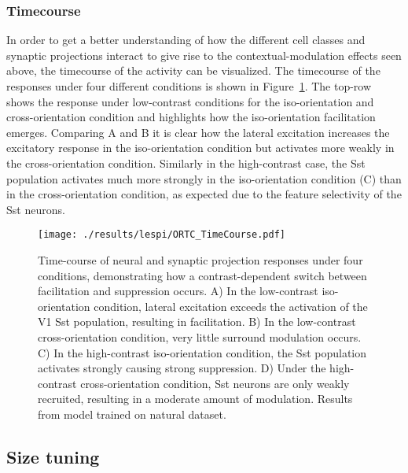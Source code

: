 \subsubsection{Timecourse}

In order to get a better understanding of how the different cell
classes and synaptic projections interact to give rise to the
contextual-modulation effects seen above, the timecourse of the
activity can be visualized. The timecourse of the responses under four
different conditions is shown in Figure~\ref{ORTC_TimeCourse}. The
top-row shows the response under low-contrast conditions for the
iso-orientation and cross-orientation condition and highlights how the
iso-orientation facilitation emerges. Comparing A and B it is clear 
how the lateral excitation increases the excitatory response in
the iso-orientation condition but activates more weakly in the
cross-orientation condition. Similarly in the high-contrast case, the
Sst population activates much more strongly in the iso-orientation
condition (C) than in the cross-orientation condition, as expected due
to the feature selectivity of the Sst neurons.

\begin{figure}
	\centering
        \texttt{[image: ./results/lespi/ORTC\_TimeCourse.pdf]}
	\caption[Time-course of neural and synaptic projection responses
      under four conditions, demonstrating how a contrast-dependent
      switch between facilitation and suppression occurs]{Time-course
      of neural and synaptic projection responses under four
      conditions, demonstrating how a contrast-dependent switch
      between facilitation and suppression occurs. A) In the
      low-contrast iso-orientation condition, lateral excitation
      exceeds the activation of the V1 Sst population, resulting in
      facilitation. B) In the low-contrast cross-orientation
      condition, very little surround modulation occurs. C) In the
      high-contrast iso-orientation condition, the Sst population
      activates strongly causing strong suppression. D) Under the
      high-contrast cross-orientation condition, Sst neurons are only
      weakly recruited, resulting in a moderate amount of modulation.
      Results from model trained on natural dataset.}
	\label{ORTC_TimeCourse}
\end{figure}

\subsection{Size tuning}

